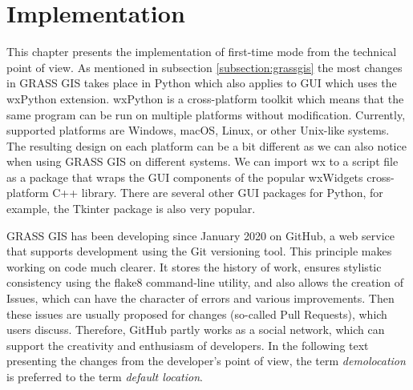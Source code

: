 \documentclass[a4paper,10pt,twoside]{article}
\begin{document}
\newpage
\vspace*{-1cm}
\section{Implementation}
\noindent
\large

\noindent This chapter presents the implementation of first-time mode
from the technical point of view. As mentioned in subsection
\ref{subsection:grassgis} the most changes in GRASS GIS takes place in
Python which also applies to GUI which uses the wxPython
extension. wxPython is a cross-platform toolkit which means that the
same program can be run on multiple platforms without
modification. Currently, supported platforms are Windows, macOS,
Linux, or other Unix-like systems. The resulting design on each
platform can be a bit different as we can also notice when using GRASS
GIS on different systems. We can import wx to a script file as a
package that wraps the GUI components of the popular wxWidgets
cross-platform C++ library. There are several other GUI packages for
Python, for example, the Tkinter package is also very popular.

GRASS GIS has been developing since January 2020 on GitHub, a web
service that supports development using the Git versioning tool. This
principle makes working on code much clearer. It stores the history of
work, ensures stylistic consistency using the flake8 command-line
utility, and also allows the creation of Issues, which can have the
character of errors and various improvements. Then these issues are
usually proposed for changes (so-called Pull Requests), which users
discuss. Therefore, GitHub partly works as a social network, which can
support the creativity and enthusiasm of developers. In the following
text presenting the changes from the developer's point of view, the
term \textit{demolocation} is preferred to the term \textit{default
  location}.
\end{document}
